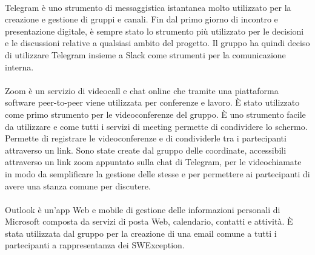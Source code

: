 \paragraph{}
Telegram è uno strumento di messaggistica istantanea molto utilizzato per la creazione e gestione di gruppi e canali. Fin dal primo giorno di incontro e presentazione digitale, è sempre stato lo strumento più utilizzato per le decisioni e le discussioni relative a qualsiasi ambito del progetto. Il gruppo ha quindi deciso di utilizzare Telegram insieme a Slack come strumenti per la comunicazione interna.

\paragraph{}
Zoom è un servizio di videocall e chat online che tramite una piattaforma software peer-to-peer viene utilizzata per conferenze e lavoro. È stato utilizzato come primo strumento per le videoconferenze del gruppo. È uno strumento facile da utilizzare e come tutti i servizi di meeting permette di condividere lo schermo. Permette di registrare le videoconferenze e di condividerle tra i partecipanti attraverso un link. Sono state create dal gruppo delle coordinate, accessibili attraverso un link zoom appuntato sulla chat di Telegram, per le videochiamate in modo da semplificare la gestione delle stesse e per permettere ai partecipanti di avere una stanza comune per discutere.

\paragraph{}
Outlook è un'app Web e mobile di gestione delle informazioni personali di Microsoft composta da servizi di posta Web, calendario, contatti e attività. È stata utilizzata dal gruppo per la creazione di una email comune a tutti i partecipanti a rappresentanza dei SWException.

